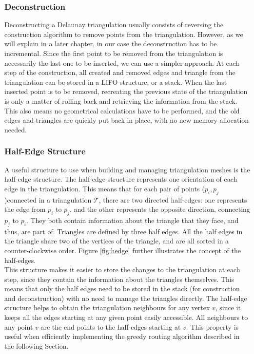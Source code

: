 \subsubsection*{Deconstruction}
Deconstructing a Delaunay triangulation usually consists of reversing the construction algorithm to remove points from the triangulation. However, as we will explain in a later chapter, in our case the deconstruction has to be incremental. Since the first point to be removed from the triangulation is necessarily the last one to be inserted, we can use a simpler approach. 
At each step of the construction, all created and removed edges and triangle from the triangulation can be stored in a LIFO structure, or a stack. When the last inserted point is to be removed, recreating the previous state of the triangulation is only a matter of rolling back and retrieving the information from the stack. This also means no geometrical calculations have to be performed, and the old edges and triangles are quickly put back in place, with no new memory allocation needed.

\subsubsection*{Half-Edge Structure}
A useful structure to use when building and managing triangulation meshes is the half-edge structure. The half-edge structure represents one orientation of each edge in the triangulation. This means that for each pair of points ($p_i,p_j$)connected in a triangulation $\mathcal{T}$, there are two directed half-edges: one represents the edge from $p_i$ to $p_j$, and the other represents the opposite direction, connecting $p_j$ to $p_i$. They both contain information about the triangle that they face, and thus, are part of. Triangles are defined by three half edges. All the half edges in the triangle share two of the vertices of the triangle, and are all sorted in a counter-clockwise order. 
Figure \ref{fig:hedge} further illustrates the concept of the half-edges.\\

This structure makes it easier to store the changes to the triangulation at each step, since they contain the information about the triangles themselves. This means that only the half edges need to be stored in the stack (for construction and deconstruction) with no need to manage the triangles directly.
The half-edge structure helps to obtain the triangulation neighbours for any vertex $v$, since it keeps all the edges starting at any given point easily accessible. All neighbours to any point $v$ are the end points to the half-edges starting at $v$. This property is useful when efficiently implementing the greedy routing algorithm described in the following Section. 

